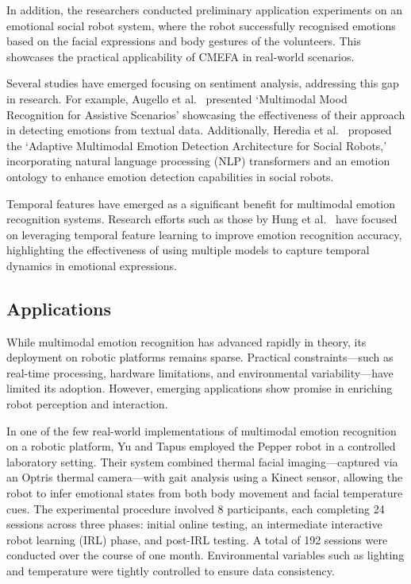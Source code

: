 In addition, the researchers conducted preliminary application experiments on an emotional social robot system, where the robot successfully recognised emotions based on the facial expressions and body gestures of the volunteers. This showcases the practical applicability of CMEFA in real-world scenarios.

Several studies have emerged focusing on sentiment analysis, addressing this gap in research. For example, Augello et al.\ \cite{Augello2022-zy} presented `Multimodal Mood Recognition for Assistive Scenarios' showcasing the effectiveness of their approach in detecting emotions from textual data. Additionally, Heredia et al.\ \cite{Heredia2022-dt} proposed the `Adaptive Multimodal Emotion Detection Architecture for Social Robots,' incorporating natural language processing (NLP) transformers and an emotion ontology to enhance emotion detection capabilities in social robots.

Temporal features have emerged as a significant benefit for multimodal emotion recognition systems. Research efforts such as those by Hung et al.\ \cite{Hung2020-gm} have focused on leveraging temporal feature learning to improve emotion recognition accuracy, highlighting the effectiveness of using multiple models to capture temporal dynamics in emotional expressions.

\subsection{Applications}

While multimodal emotion recognition has advanced rapidly in theory, its deployment on robotic platforms remains sparse. Practical constraints—such as real-time processing, hardware limitations, and environmental variability—have limited its adoption. However, emerging applications show promise in enriching robot perception and interaction.

In one of the few real-world implementations of multimodal emotion recognition on a robotic platform, Yu and Tapus \cite{Yu2019-ku} employed the Pepper robot in a controlled laboratory setting. Their system combined thermal facial imaging—captured via an Optris thermal camera—with gait analysis using a Kinect sensor, allowing the robot to infer emotional states from both body movement and facial temperature cues. The experimental procedure involved 8 participants, each completing 24 sessions across three phases: initial online testing, an intermediate interactive robot learning (IRL) phase, and post-IRL testing. A total of 192 sessions were conducted over the course of one month. Environmental variables such as lighting and temperature were tightly controlled to ensure data consistency.

